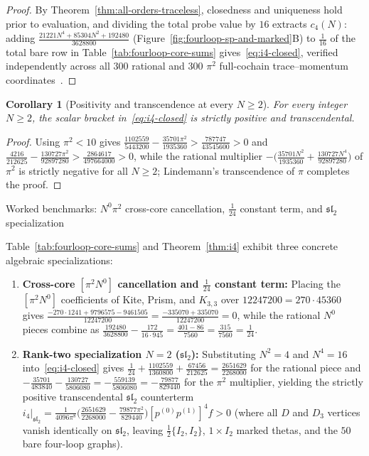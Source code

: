 \documentclass[11pt,letterpaper]{article}
\numberwithin{equation}{section}
\theoremstyle{plain}
\newtheorem{corollary}[theorem]{Corollary}
\theoremstyle{definition}
\theoremstyle{remark}
\newenvironment{example}[1][]{%
  \begin{examplebox}{#1}{}%
}{%
  \end{examplebox}%
}
\newcommand{\fsl}{\mathfrak{sl}}
\begin{document}
\begin{proof}
By Theorem~\ref{thm:all-orders-traceless}, closedness and uniqueness hold prior to evaluation, and dividing the total probe value by $16$ extracts $c_4(N)$: adding $\frac{21221N^4 + 85304N^2 + 192480}{3628800}$ (Figure~\ref{fig:fourloop-sp-and-marked}B) to $\frac{1}{16}$ of the total bare row in Table~\ref{tab:fourloop-core-sums} gives~\eqref{eq:i4-closed}, verified independently across all $300$ rational and $300$ $\pi^2$ full-cochain trace--momentum coordinates~\cite[\S6.2]{RepoAllOrders}.
\end{proof}

\begin{corollary}[Positivity and transcendence at every $N \ge 2$]
\label{cor:i4-transcendental}
For every integer $N \ge 2$, the scalar bracket in~\eqref{eq:i4-closed} is strictly positive and transcendental.
\end{corollary}

\begin{proof}
Using $\pi^2 < 10$ gives $\frac{1102559}{5443200} - \frac{35701\pi^2}{1935360} > \frac{787747}{43545600} > 0$ and $\frac{4216}{212625} - \frac{130727\pi^2}{92897280} > \frac{2864617}{497664000} > 0$, while the rational multiplier $-\big(\frac{35701N^2}{1935360} + \frac{130727N^4}{92897280}\big)$ of $\pi^2$ is strictly negative for all $N \ge 2$; Lindemann's transcendence of $\pi$ completes the proof.
\end{proof}

\begin{example}[Worked benchmarks: $N^0\pi^2$ cross-core cancellation, $\frac{1}{24}$ constant term, and $\fsl_2$ specialization]
\label{ex:i4-checks}
Table~\ref{tab:fourloop-core-sums} and Theorem~\ref{thm:i4} exhibit three concrete algebraic specializations:
\begin{enumerate}[label=(\alph*),leftmargin=*]
  \item \textbf{Cross-core $[\pi^2 N^0]$ cancellation and $\frac{1}{24}$ constant term:} Placing the $[\pi^2 N^0]$ coefficients of Kite, Prism, and $K_{3,3}$ over $12247200 = 270 \cdot 45360$ gives $\frac{-270\cdot 1241 + 9796575 - 9461505}{12247200} = \frac{-335070 + 335070}{12247200} = 0$, while the rational $N^0$ pieces combine as $\frac{192480}{3628800} - \frac{172}{16\cdot 945} = \frac{401 - 86}{7560} = \frac{315}{7560} = \frac{1}{24}$.
  \item \textbf{Rank-two specialization $N = 2$ ($\fsl_2$):} Substituting $N^2 = 4$ and $N^4 = 16$ into~\eqref{eq:i4-closed} gives $\frac{1}{24} + \frac{1102559}{1360800} + \frac{67456}{212625} = \frac{2651629}{2268000}$ for the rational piece and $-\frac{35701}{483840} - \frac{130727}{5806080} = -\frac{559139}{5806080} = -\frac{79877}{829440}$ for the $\pi^2$ multiplier, yielding the strictly positive transcendental $\fsl_2$ counterterm $i_4|_{\fsl_2} = \frac{1}{4096\pi^8}\big(\frac{2651629}{2268000} - \frac{79877\pi^2}{829440}\big)[p^{(0)}p^{(1)}]^4 f > 0$ (where all $D$ and $D_3$ vertices vanish identically on $\fsl_2$, leaving $\frac{1}{2}\{I_2,I_2\}$, $1\times I_2$ marked thetas, and the $50$ bare four-loop graphs).
\end{enumerate}
\end{example}
\end{document}
